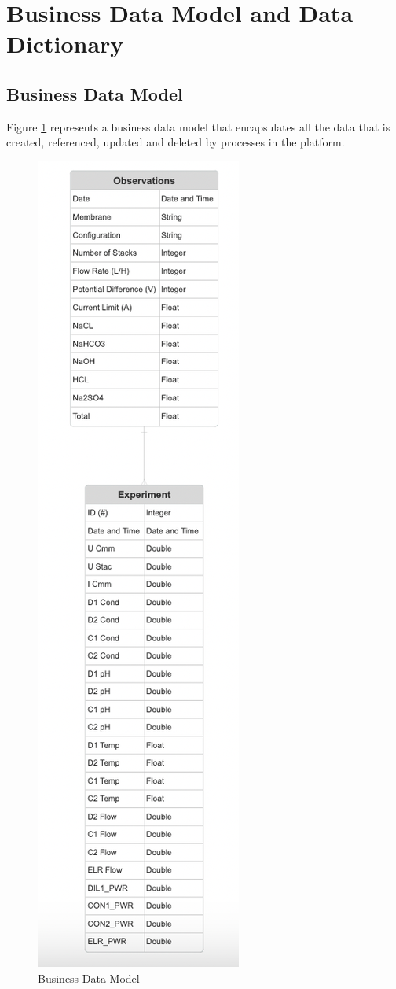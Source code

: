 \documentclass[12pt]{article}
\begin{document}
\section{Business Data Model and Data Dictionary}
\subsection{Business Data Model}
Figure \ref{BusinessDataModel} represents a business data model that encapsulates all the data that is
created, referenced, updated and deleted by processes in the platform.

\begin{figure}[H]
  \centering
  \includegraphics[scale=0.98]{Diagrams/Business Data Model.png}
  \caption{Business Data Model}
  \label{BusinessDataModel}
\end{figure}
\end{document}
